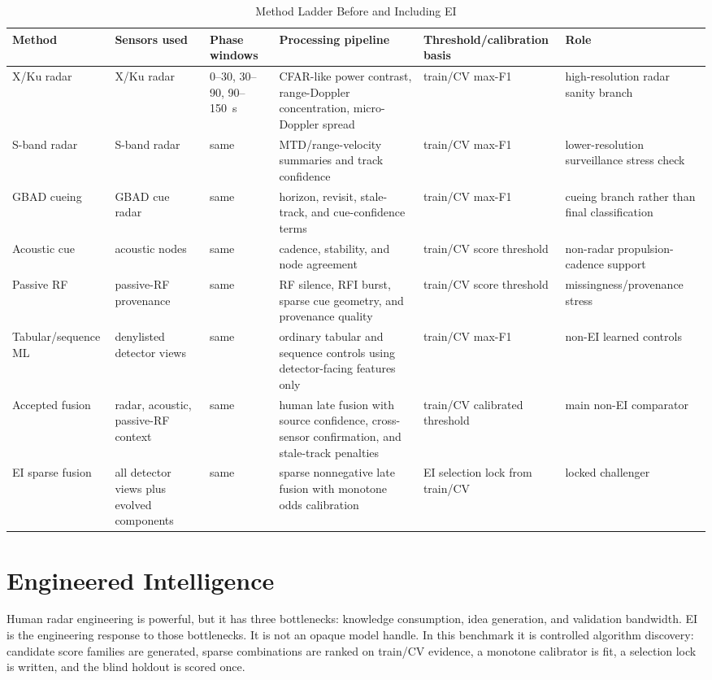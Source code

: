 \documentclass[10pt,journal]{IEEEtran}
\begin{document}
\begin{table}[t]
  \caption{Method Ladder Before and Including EI}
  \label{tab:humanmethods}
  \centering
  \small
  \begin{tabularx}{\textwidth}{@{}p{}p{}p{}Yp{0.16\textwidth}Y@{}}
    \toprule
    Method & Sensors used & Phase windows & Processing pipeline & Threshold/calibration basis & Role \\
    \midrule
    X/Ku radar & X/Ku radar & 0--30, 30--90, 90--150~s & CFAR-like power contrast, range-Doppler concentration, micro-Doppler spread & train/CV max-F1 & high-resolution radar sanity branch \\
    S-band radar & S-band radar & same & MTD/range-velocity summaries and track confidence & train/CV max-F1 & lower-resolution surveillance stress check \\
    GBAD cueing & GBAD cue radar & same & horizon, revisit, stale-track, and cue-confidence terms & train/CV max-F1 & cueing branch rather than final classification \\
    Acoustic cue & acoustic nodes & same & cadence, stability, and node agreement & train/CV score threshold & non-radar propulsion-cadence support \\
    Passive RF & passive-RF provenance & same & RF silence, RFI burst, sparse cue geometry, and provenance quality & train/CV score threshold & missingness/provenance stress \\
    Tabular/sequence ML & denylisted detector views & same & ordinary tabular and sequence controls using detector-facing features only & train/CV max-F1 & non-EI learned controls \\
    Accepted fusion & radar, acoustic, passive-RF context & same & human late fusion with source confidence, cross-sensor confirmation, and stale-track penalties & train/CV calibrated threshold & main non-EI comparator \\
    EI sparse fusion & all detector views plus evolved components & same & sparse nonnegative late fusion with monotone odds calibration & EI selection lock from train/CV & locked challenger \\
    \bottomrule
  \end{tabularx}
\end{table}

\section{Engineered Intelligence}
Human radar engineering is powerful, but it has three bottlenecks: knowledge consumption, idea generation, and validation bandwidth. EI is the engineering response to those bottlenecks. It is not an opaque model handle. In this benchmark it is controlled algorithm discovery: candidate score families are generated, sparse combinations are ranked on train/CV evidence, a monotone calibrator is fit, a selection lock is written, and the blind holdout is scored once.
\end{document}
